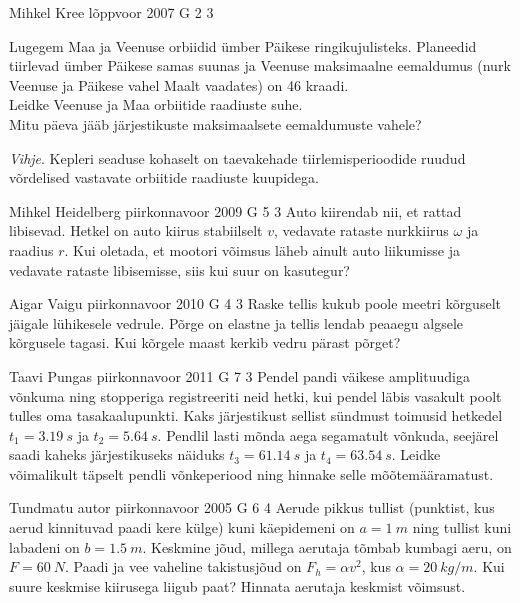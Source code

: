 \documentclass[11pt]{article}
\begin{document}
{%
{Mihkel Kree} %
{lõppvoor} %
{2007} %
{G 2} %
{3} %
{
\ifStatement
Lugegem Maa ja Veenuse orbiidid ümber Päikese ringikujulisteks. Planeedid tiirlevad ümber Päikese samas suunas ja Veenuse maksimaalne eemaldumus (nurk Veenuse ja Päikese vahel Maalt vaadates) on 46 kraadi.\\
\osa Leidke Veenuse ja Maa orbiitide raadiuste suhe.\\
\osa Mitu päeva jääb järjestikuste maksimaalsete eemaldumuste vahele?

\emph{Vihje}. Kepleri seaduse kohaselt on taevakehade tiirlemisperioodide ruudud võrdelised vastavate orbiitide raadiuste kuupidega.
\fi
}

{Mihkel Heidelberg} %
{piirkonnavoor} %
{2009} %
{G 5} %
{3} %
{
\ifStatement
Auto kiirendab nii, et rattad libisevad. Hetkel on auto kiirus stabiilselt $v$, vedavate rataste nurkkiirus $\omega$ ja raadius $r$. Kui oletada, et mootori võimsus läheb ainult auto liikumisse ja vedavate rataste libisemisse, siis kui suur on kasutegur?
\fi
}

{Aigar Vaigu} %
{piirkonnavoor} %
{2010} %
{G 4} %
{3} %
{
\ifStatement
Raske tellis kukub poole meetri kõrguselt jäigale lühikesele vedrule. Põrge
on elastne ja tellis lendab peaaegu algsele kõrgusele tagasi. Kui
kõrgele maast kerkib vedru pärast põrget?
\fi
}

{Taavi Pungas} %
{piirkonnavoor} %
{2011} %
{G 7} %
{3} %
{
\ifStatement
Pendel pandi väikese amplituudiga võnkuma ning stopperiga registreeriti neid hetki, kui pendel läbis vasakult poolt tulles oma tasakaalupunkti. Kaks järjestikust sellist sündmust toimusid hetkedel $t_1=\SI{3,19}{s}$ ja $t_2=\SI{5,64}{s}$. Pendlil lasti mõnda aega segamatult võnkuda, seejärel saadi kaheks järjestikuseks näiduks $t_3=\SI{61,14}{s}$ ja $t_4=\SI{63,54}{s}$. Leidke võimalikult täpselt pendli võnkeperiood ning hinnake selle mõõtemääramatust.
\fi
}

{Tundmatu autor} %
{piirkonnavoor} %
{2005} %
{G 6} %
{4} %
{
\ifStatement
Aerude pikkus tullist (punktist, kus aerud kinnituvad paadi kere külge) kuni käepidemeni on $a = \SI{1}{m}$ ning tullist kuni labadeni on $b = \SI{1,5}{m}$. Keskmine jõud, millega aerutaja tõmbab kumbagi aeru, on $F = \SI{60}{N}$. Paadi ja vee vaheline takistusjõud on $F_h = \alpha v^2$, kus $\alpha = \SI{20}{kg/m}$. Kui suure keskmise kiirusega liigub paat? Hinnata aerutaja keskmist võimsust.
\fi
}

}
\end{document}

